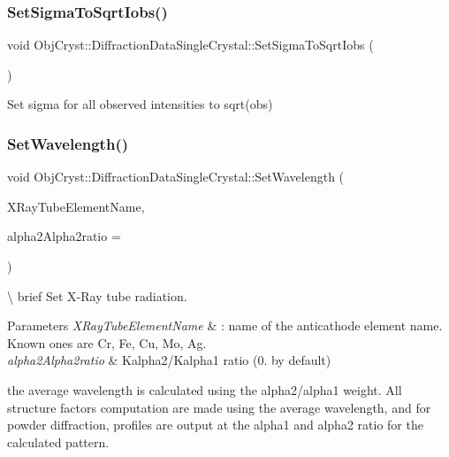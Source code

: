 \subsubsection{\texorpdfstring{SetSigmaToSqrtIobs()}{SetSigmaToSqrtIobs()}}
{\footnotesize\ttfamily void Obj\+Cryst\+::\+Diffraction\+Data\+Single\+Crystal\+::\+Set\+Sigma\+To\+Sqrt\+Iobs (\begin{DoxyParamCaption}{ }\end{DoxyParamCaption})\hspace{0.3cm}{\ttfamily [virtual]}}



Set sigma for all observed intensities to sqrt(obs) 

\mbox{\label{class_obj_cryst_1_1_diffraction_data_single_crystal_a231437207dca7389aa593b1fd4fd9f1b}} 
\subsubsection{\texorpdfstring{SetWavelength()}{SetWavelength()}}
{\footnotesize\ttfamily void Obj\+Cryst\+::\+Diffraction\+Data\+Single\+Crystal\+::\+Set\+Wavelength (\begin{DoxyParamCaption}\item[{const string \&}]{X\+Ray\+Tube\+Element\+Name,  }\item[{const R\+E\+AL}]{alpha2\+Alpha2ratio = {} }\end{DoxyParamCaption})}

\textbackslash{} brief Set X-\/\+Ray tube radiation.


\begin{DoxyParams}{Parameters}
{\em X\+Ray\+Tube\+Element\+Name} & \+: name of the anticathode element name. Known ones are Cr, Fe, Cu, Mo, Ag. \\
\hline
{\em alpha2\+Alpha2ratio} & Kalpha2/\+Kalpha1 ratio (0. by default)\\
\hline
\end{DoxyParams}
the average wavelength is calculated using the alpha2/alpha1 weight. All structure factors computation are made using the average wavelength, and for powder diffraction, profiles are output at the alpha1 and alpha2 ratio for the calculated pattern.

